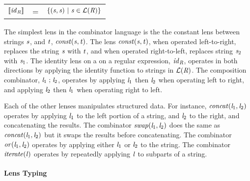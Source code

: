 \documentclass[numbers,10pt,preprint\ifanon ,nocopyrightspace\fi]{sigplanconf}
\begin{document}
\begin{center}
\begin{tabular}{@{}rcl}
    $\SemanticsOf{\IdentityLensOf{\Regex}}$ &=& $\SetOf{(\String,\String)
                                              \SuchThat \String\in
                                              \LanguageOf{\Regex}}$
  \end{tabular}
\end{center}

The simplest lens in the combinator language is the the constant lens between
strings $\String$, and $\StringAlt$, $\ConstLensOf{\String}{\StringAlt}$.
The lens $\ConstLensOf{\String}{\StringAlt}$, when operated left-to-right,
replaces the string $\String$ with $\StringAlt$, and when operated
right-to-left, replaces string $\String_2$ with $\String_1$.  The identity lens
on a on a regular expression, $\IdentityLensOf{\Regex}$, operates in both
directions by applying the
identity function to strings in $\LanguageOf{\Regex}$.  The composition
combinator, 
$\ComposeLensOf{\Lens_2}{\Lens_1}$, operates by applying $\Lens_1$ then $\Lens_2$
when operating left to right, and applying $\Lens_2$ then $\Lens_1$ when
operating right to left.

Each of the other lenses manipulates structured data.  For instance,
$\ConcatLensOf{\Lens_1}{\Lens_2}$ operates by applying $\Lens_1$ to the left
portion of a string, and $\Lens_2$ to the right, and concatenating the results.
The combinator
$\SwapLensOf{\Lens_1}{\Lens_2}$ does the same as $\ConcatLensOf{\Lens_1}{\Lens_2}$
but it swaps the results before concatenating.
The combinator $\OrLensOf{\Lens_1}{\Lens_2}$ operates by applying either $\Lens_1$ or $\Lens_2$
to the string.  The combinator $\IterateLensOf{\Lens}$ operates by repeatedly
applying $\Lens$ to subparts of a string.

\paragraph{Lens Typing}
\end{document}
